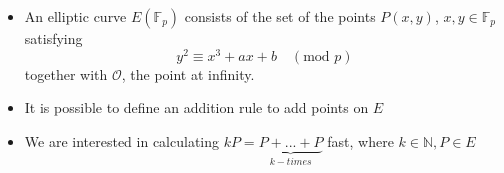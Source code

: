 \documentclass{beamer}
\begin{document}
  \begin{frame}
  \begin{itemize}
  \item{
  An elliptic curve $E(\mathbb{F}_p)$ consists of the set of the points $P(x,y)$, $x,y \in \mathbb{F}_p$ satisfying
  \begin{equation*}
  y^2 \equiv x^3 + ax + b \quad (\text{mod } p)
  \end{equation*}
  together with $\mathcal{O}$, the point at infinity.
  }
  \item{
  It is possible to define an addition rule to add points on $E$
  }
  \item{
  We are interested in calculating $kP = \underbrace{P+...+P}_{k-times}$ fast, where $k \in \mathbb{N}, P \in E$
  }
  \end{itemize}
  \end{frame}
\end{document}
